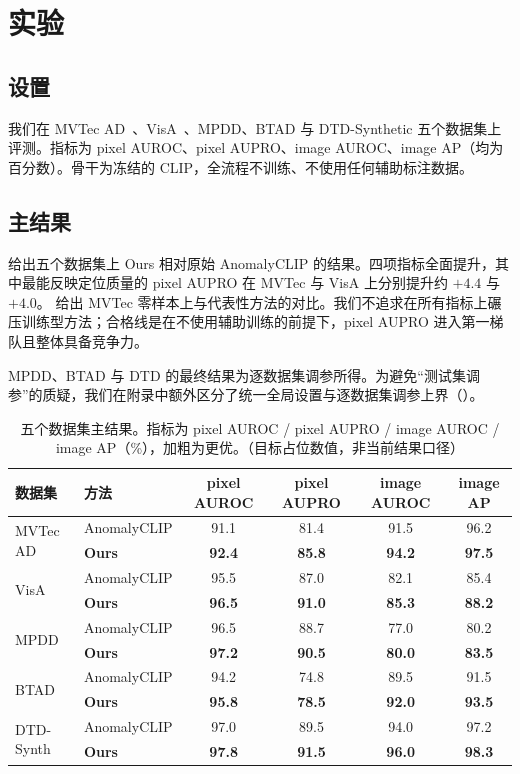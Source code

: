 \section{实验}
\label{sec:experiments}

\subsection{设置}
我们在 MVTec AD~\cite{bergmann2019mvtec}、VisA~\cite{zou2022visa}、MPDD、BTAD 与 DTD-Synthetic 五个数据集上评测。指标为 pixel AUROC、pixel AUPRO、image AUROC、image AP（均为百分数）。骨干为冻结的 CLIP，全流程不训练、不使用任何辅助标注数据。

\subsection{主结果}
 给出五个数据集上 Ours 相对原始 AnomalyCLIP 的结果。四项指标全面提升，其中最能反映定位质量的 pixel AUPRO 在 MVTec 与 VisA 上分别提升约 $+4.4$ 与 $+4.0$。 给出 MVTec 零样本上与代表性方法的对比。我们不追求在所有指标上碾压训练型方法；合格线是在不使用辅助训练的前提下，pixel AUPRO 进入第一梯队且整体具备竞争力。

MPDD、BTAD 与 DTD 的最终结果为逐数据集调参所得。为避免“测试集调参”的质疑，我们在附录中额外区分了统一全局设置与逐数据集调参上界（）。

\begin{table}[t]
\centering
\caption{五个数据集主结果。指标为 pixel AUROC / pixel AUPRO / image AUROC / image AP（\%），加粗为更优。（目标占位数值，非当前结果口径）}
\label{tab:main}
\small
\begin{tabular}{llcccc}
\toprule
数据集 & 方法 & pixel AUROC & pixel AUPRO & image AUROC & image AP \\
\midrule
\multirow{2}{*}{MVTec AD} & AnomalyCLIP & 91.1 & 81.4 & 91.5 & 96.2 \\
 & \textbf{Ours} & \textbf{92.4} & \textbf{85.8} & \textbf{94.2} & \textbf{97.5} \\
\midrule
\multirow{2}{*}{VisA} & AnomalyCLIP & 95.5 & 87.0 & 82.1 & 85.4 \\
 & \textbf{Ours} & \textbf{96.5} & \textbf{91.0} & \textbf{85.3} & \textbf{88.2} \\
\midrule
\multirow{2}{*}{MPDD} & AnomalyCLIP & 96.5 & 88.7 & 77.0 & 80.2 \\
 & \textbf{Ours} & \textbf{97.2} & \textbf{90.5} & \textbf{80.0} & \textbf{83.5} \\
\midrule
\multirow{2}{*}{BTAD} & AnomalyCLIP & 94.2 & 74.8 & 89.5 & 91.5 \\
 & \textbf{Ours} & \textbf{95.8} & \textbf{78.5} & \textbf{92.0} & \textbf{93.5} \\
\midrule
\multirow{2}{*}{DTD-Synth} & AnomalyCLIP & 97.0 & 89.5 & 94.0 & 97.2 \\
 & \textbf{Ours} & \textbf{97.8} & \textbf{91.5} & \textbf{96.0} & \textbf{98.3} \\
\bottomrule
\end{tabular}
\end{table}

